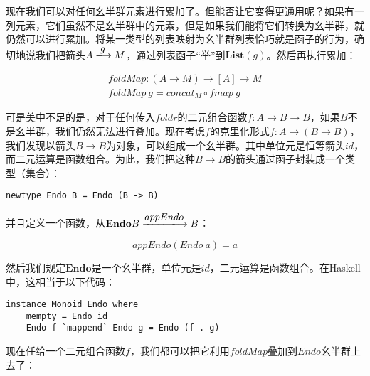 \documentclass{article}
\begin{document}
现在我们可以对任何幺半群元素进行累加了。但能否让它变得更通用呢？如果有一列元素，它们虽然不是幺半群中的元素，但是如果我们能将它们转换为幺半群，就仍然可以进行累加。将某一类型的列表映射为幺半群列表恰巧就是函子的行为，确切地说我们把箭头$A \arrowto{g} M$，通过列表函子“举”到$\mathbf{List}(g)$。然后再执行累加：

\begin{center}
\end{center}

\[
\begin{array}{l}
foldMap : (A \to M) \to [A] \to M \\
foldMap\ g = concat_M \circ fmap\ g
\end{array}
\]

可是美中不足的是，对于任何传入$foldr$的二元组合函数$f : A \to B \to B$，如果$B$不是幺半群，我们仍然无法进行叠加。现在考虑$f$的克里化形式$f : A \to (B \to B)$，我们发现以箭头$B \to B$为对象，可以组成一个幺半群。其中单位元是恒等箭头$id$，而二元运算是函数组合。为此，我们把这种$B \to B$的箭头通过函子封装成一个类型（集合）：

\lstset{frame=none}
\begin{lstlisting}[style=Haskell]
newtype Endo B = Endo (B -> B)
\end{lstlisting}

并且定义一个函数，从$\mathbf{Endo}B \arrowto{appEndo} B$：

\[
appEndo(Endo\ a) = a
\]

然后我们规定$\mathbf{Endo}$是一个幺半群，单位元是$id$，二元运算是函数组合。在Haskell中，这相当于以下代码：

\lstset{frame=single}
\begin{lstlisting}[style=Haskell]
instance Monoid Endo where
    mempty = Endo id
    Endo f `mappend` Endo g = Endo (f . g)
\end{lstlisting}

现在任给一个二元组合函数$f$，我们都可以把它利用$foldMap$叠加到$Endo$幺半群上去了：
\end{document}
